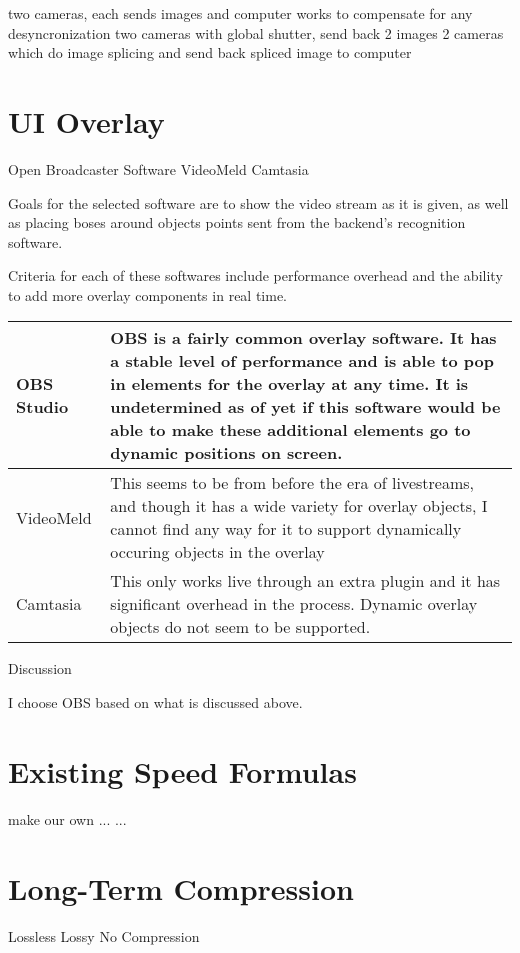 \documentclass[letterpaper,10pt,onecolumn,draftclsnofoot]{IEEEtran}
\begin{document}
two cameras, each sends images and computer works to compensate for any desyncronization
two cameras with global shutter, send back 2 images
2 cameras which do image splicing and send back spliced image to computer

\section{UI Overlay} %

Open Broadcaster Software
VideoMeld
Camtasia

Goals for the selected software are to show the video stream as it is given, as well as placing boses around objects points sent from the backend's recognition software.

Criteria for each of these softwares include performance overhead and the ability to add more overlay components in real time.

\begin{tabular}{ l l }
  OBS Studio & OBS is a fairly common overlay software.  It has a stable level of performance and is able to pop in elements for the overlay at any time.  It is undetermined as of yet if this software would be able to make these additional elements go to dynamic positions on screen. \\ \hline
  VideoMeld & This seems to be from before the era of livestreams, and though it has a wide variety for overlay objects, I cannot find any way for it to support dynamically occuring objects in the overlay  \\ \hline
  Camtasia & This only works live through an extra plugin and it has significant overhead in the process.  Dynamic overlay objects do not seem to be supported. \\
\end{tabular}

Discussion

I choose OBS based on what is discussed above.


\section{Existing Speed Formulas} %

make our own
...
...

\section{Long-Term Compression} %

Lossless
Lossy
No Compression



\end{document}
